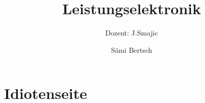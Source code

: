 \documentclass{scrartcl}
\title{Leistungselektronik}
\subtitle{Dozent: J.Smajic}
\author{S\"ami Bertsch}
\begin{document}
























\section{Idiotenseite}
%



\end{document}
